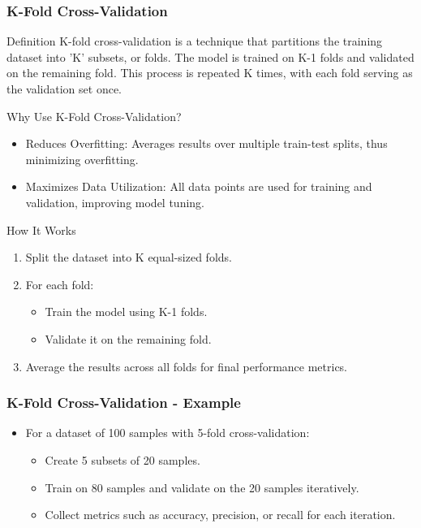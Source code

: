 \documentclass[aspectratio=169]{beamer}
\begin{document}
\begin{frame}[fragile]
    \frametitle{K-Fold Cross-Validation}
    \begin{block}{Definition}
        K-fold cross-validation is a technique that partitions the training dataset into 'K' subsets, or folds. The model is trained on K-1 folds and validated on the remaining fold. This process is repeated K times, with each fold serving as the validation set once.
    \end{block}

    \begin{block}{Why Use K-Fold Cross-Validation?}
        \begin{itemize}
            \item Reduces Overfitting: Averages results over multiple train-test splits, thus minimizing overfitting.
            \item Maximizes Data Utilization: All data points are used for training and validation, improving model tuning.
        \end{itemize}
    \end{block}
    
    \begin{block}{How It Works}
        \begin{enumerate}
            \item Split the dataset into K equal-sized folds.
            \item For each fold:
            \begin{itemize}
                \item Train the model using K-1 folds.
                \item Validate it on the remaining fold.
            \end{itemize}
            \item Average the results across all folds for final performance metrics.
        \end{enumerate}
    \end{block}
\end{frame}

\begin{frame}[fragile]
    \frametitle{K-Fold Cross-Validation - Example}
    \begin{itemize}
        \item For a dataset of 100 samples with 5-fold cross-validation:
        \begin{itemize}
            \item Create 5 subsets of 20 samples.
            \item Train on 80 samples and validate on the 20 samples iteratively.
            \item Collect metrics such as accuracy, precision, or recall for each iteration.
        \end{itemize}
    \end{itemize}
\end{frame}
\end{document}

